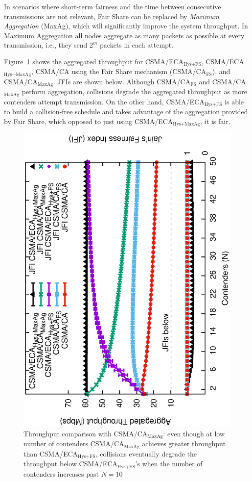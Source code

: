 	In scenarios where short-term fairness and the time between consecutive transmissions are not relevant, Fair Share can be replaced by \emph{Maximum Aggregation} (MaxAg), which will significantly improve the system throughput. In Maximum Aggregation all nodes aggregate as many packets as possible at every transmission, i.e., they send $2^m$ packets in each attempt.

	Figure~\ref{fig:ECA-vs-DCF-maxAgg} shows the aggregated throughput for CSMA/ECA$_{\text{Hys+FS}}$, CSMA/ECA$_{\text{Hys+MaxAg}}$, CSMA/CA using the Fair Share mechanism (CSMA/CA$_{\text{FS}}$), and CSMA/CA$_{\text{MaxAg}}$. JFIs are shown below. Although CSMA/CA$_{\text{FS}}$ and CSMA/CA$_{\text{MaxAg}}$ perform aggregation, collisions degrade the aggregated throughput as more contenders attempt transmission. On the other hand, CSMA/ECA$_{\text{Hys+FS}}$ is able to build a collision-free schedule and takes advantage of the aggregation provided by Fair Share, which opposed to just using CSMA/ECA$_{\text{Hys+MaxAg}}$, it is fair.
	
	
	\begin{figure}[tb]
	\centering
		\includegraphics[width=0.7\linewidth,angle=-90]{figures/throughput-max-Ag/throughput-saturated-maxAgg-TON.eps}
		\caption{Throughput comparison with CSMA/CA$_{\text{MaxAg}}$: even though at low number of contenders CSMA/CA$_{\text{MaxAg}}$ achieves greater throughput than CSMA/ECA$_{\text{Hys+FS}}$, collisions eventually degrade the throughput below CSMA/ECA$_{\text{Hys+FS}}$'s when the number of contenders increases past $N=10$}
		\label{fig:ECA-vs-DCF-maxAgg}
	\end{figure}
	
